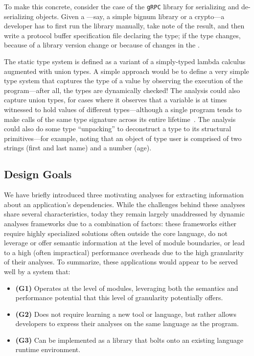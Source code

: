 \documentclass[letterpaper,twocolumn,10pt]{article}
\newcommand{\heading}[1]{\vspace{2pt}\noindent\textbf{#1}\enspace}
\newcommand{\ttt}[1]{\texttt{#1}}
\begin{document}
To make this concrete, consider the case of the \ttt{gRPC} library for serializing and de-serializing objects.
Given a ---say, a simple bignum library or a crypto---a developer has to first run the library manually, take note of the result, and then write a protocol buffer specification file declaring the type; %
if the type changes, because of a library version change or because of changes in the .

The static type system is defined as a variant of a simply-typed lambda calculus augmented with union types.
A simple approach would be to define a very simple type system that captures the type of a value by observing the execution of the program---after all, the types are dynamically checked!
The analysis could also capture union types, for cases where it observes that a variable is at times witnessed to hold values of different types---although a single program tends to make calls of the same type signature across its entire lifetime~\cite{daikon}.
The analysis could also do some type ``unpacking'' to deconstruct a type to its structural primitives---for example, noting that an object of type user is comprised of two strings (first and last name) and a number (age).




\subsection{Design Goals}

We have briefly introduced three motivating analyses for extracting information about an application's dependencies.
While the challenges behind these analyses share several characteristics, today they remain largely unaddressed by dynamic analyses frameworks due to a combination of factors:
  these frameworks either require highly specialized solutions often outside the core language,
  do not leverage or offer semantic information at the level of module boundaries, or
  lead to a high (often impractical) performance overheads due to the high granularity of their analyses.
To summarize, these applications would appear to be served well by a system that:
\begin{itemize}
  \item \textbf{(G1)} Operates at the level of modules, leveraging both the semantics and performance potential that this level of granularity potentially offers.
  \item \textbf{(G2)} Does not require learning a new tool or language, but rather allows developers to express their analyses on the same language as the program.
  \item \textbf{(G3)} Can be implemented as a library that bolts onto an existing language runtime environment.
\end{itemize}
\end{document}
